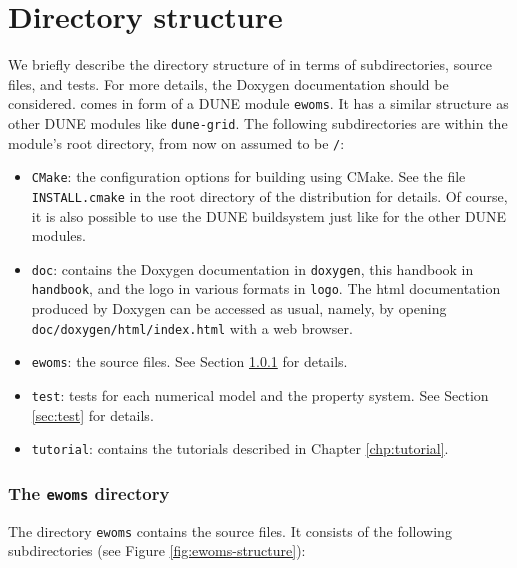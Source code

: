 \chapter{Directory structure}

We briefly describe the directory structure of \eWoms in terms 
of subdirectories, source files, and tests. For more details, 
the Doxygen documentation should be considered. 
\eWoms comes in form of a DUNE module \texttt{ewoms}. 
It has a similar structure as other DUNE modules like \texttt{dune-grid}. 
The following subdirectories are within the module's root directory, 
from now on assumed to be \texttt{/}: 
\begin{itemize} 
\item \texttt{CMake}: the configuration options 
for building \eWoms using CMake. See the file \texttt{INSTALL.cmake} in 
the root directory of the \eWoms distribution for details. Of course, 
it is also possible to use the DUNE buildsystem just like for the other 
DUNE modules.
\item \texttt{doc}: contains the Doxygen documentation in \texttt{doxygen}, 
this handbook in \texttt{handbook}, and the \eWoms logo in various formats in 
\texttt{logo}. The html documentation produced by Doxygen can be accessed as usual, 
namely, by opening \texttt{doc/doxygen/html/index.html} with a web browser. 
\item \texttt{ewoms}: the \eWoms source files. See Section \ref{sec:ewoms} for details. 
\item \texttt{test}: tests for each numerical model and the property system. 
See Section \ref{sec:test} for details. 
\item \texttt{tutorial}: contains the tutorials described in Chapter \ref{chp:tutorial}. 
\end{itemize}


\subsection{The \texttt{ewoms} directory}\label{sec:ewoms}

The directory \texttt{ewoms} contains the \eWoms source files. It consists of the following subdirectories (see Figure \ref{fig:ewoms-structure}): 

